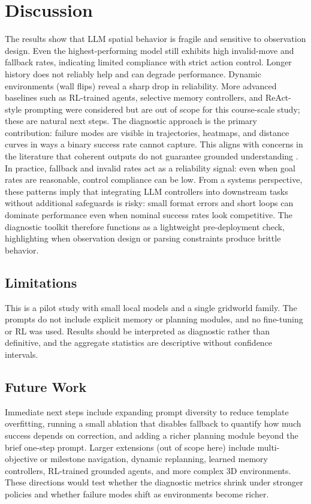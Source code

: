 \documentclass[conference]{IEEEtran}
\begin{document}
\section{Discussion}
The results show that LLM spatial behavior is fragile and sensitive to observation design. Even the highest-performing model still exhibits high invalid-move and fallback rates, indicating limited compliance with strict action control. Longer history does not reliably help and can degrade performance. Dynamic environments (wall flips) reveal a sharp drop in reliability. More advanced baselines such as RL-trained agents, selective memory controllers, and ReAct-style prompting were considered but are out of scope for this course-scale study; these are natural next steps.
The diagnostic approach is the primary contribution: failure modes are visible in trajectories, heatmaps, and distance curves in ways a binary success rate cannot capture. This aligns with concerns in the literature that coherent outputs do not guarantee grounded understanding \cite{stochasticparrots}. In practice, fallback and invalid rates act as a reliability signal: even when goal rates are reasonable, control compliance can be low.
From a systems perspective, these patterns imply that integrating LLM controllers into downstream tasks without additional safeguards is risky: small format errors and short loops can dominate performance even when nominal success rates look competitive. The diagnostic toolkit therefore functions as a lightweight pre-deployment check, highlighting when observation design or parsing constraints produce brittle behavior.

\subsection{Limitations}
This is a pilot study with small local models and a single gridworld family. The prompts do not include explicit memory or planning modules, and no fine-tuning or RL was used. Results should be interpreted as diagnostic rather than definitive, and the aggregate statistics are descriptive without confidence intervals.

\subsection{Future Work}
Immediate next steps include expanding prompt diversity to reduce template overfitting, running a small ablation that disables fallback to quantify how much success depends on correction, and adding a richer planning module beyond the brief one-step prompt. Larger extensions (out of scope here) include multi-objective or milestone navigation, dynamic replanning, learned memory controllers, RL-trained grounded agents, and more complex 3D environments. These directions would test whether the diagnostic metrics shrink under stronger policies and whether failure modes shift as environments become richer.
\end{document}
